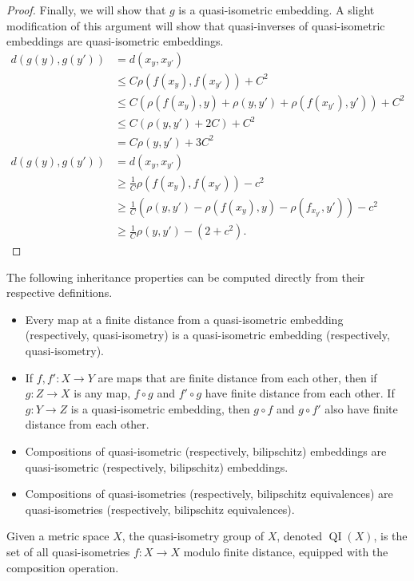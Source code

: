 \documentclass[10pt]{mypackage}
\begin{document}
\begin{proof}
  Finally, we will show that $g$ is a quasi-isometric embedding. A slight modification of this argument will show that quasi-inverses of quasi-isometric embeddings are quasi-isometric embeddings.
  \begin{align*}
    d\left( g(y),g(y') \right) &= d\left( x_y,x_{y'} \right)\\
                               &\leq C\rho\left( f\left( x_y \right),f\left( x_{y'} \right) \right) + C^2\\
                               &\leq C\left( \rho\left( f\left( x_y \right),y \right) + \rho\left( y,y' \right) + \rho\left( f\left( x_{y'} \right),y' \right) \right) + C^2\\
                               &\leq C\left( \rho\left( y,y' \right) + 2C \right) + C^2\\
                               &= C\rho\left( y,y' \right) + 3C^2\\
    d\left( g\left( y \right),g\left( y' \right) \right) &= d\left( x_y,x_{y'} \right)\\
                                                         &\geq \frac{1}{C}\rho\left( f\left( x_y \right),f\left( x_{y'} \right) \right) - c^2\\
                                                         &\geq \frac{1}{C}\left( \rho\left( y,y' \right) - \rho\left( f\left( x_y \right),y \right) - \rho\left( f_{x_{y'}},y' \right) \right) - c^2\\
                                                         &\geq \frac{1}{C}\rho\left( y,y' \right) - \left(2+ c^2\right).
  \end{align*}
\end{proof}
The following inheritance properties can be computed directly from their respective definitions.
\begin{itemize}
  \item Every map at a finite distance from a quasi-isometric embedding (respectively, quasi-isometry) is a quasi-isometric embedding (respectively, quasi-isometry).
  \item If $f,f'\colon X\rightarrow Y$ are maps that are finite distance from each other, then if $g\colon Z\rightarrow X$ is any map, $f\circ g$ and $f'\circ g$ have finite distance from each other. If $g\colon Y\rightarrow Z$ is a quasi-isometric embedding, then $g\circ f$ and $g\circ f'$ also have finite distance from each other.
  \item Compositions of quasi-isometric (respectively, bilipschitz) embeddings are quasi-isometric (respectively, bilipschitz) embeddings.
  \item Compositions of quasi-isometries (respectively, bilipschitz equivalences) are quasi-isometries (respectively, bilipschitz equivalences).
\end{itemize}
Given a metric space $X$, the quasi-isometry group of $X$, denoted $ \operatorname{QI}(X) $, is the set of all quasi-isometries $f\colon X\rightarrow X$ modulo finite distance, equipped with the composition operation.
\end{document}
